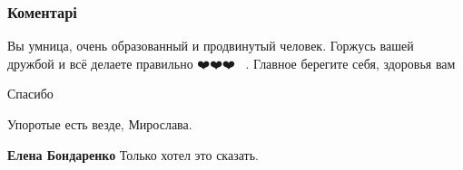  
 
 
 
 
\subsubsection{Коментарі}
\label{sec:27_07_2021.fb.berdnik_miroslava.3.neadekvat_mova.cmt}

\begin{itemize}
 
Вы умница, очень образованный и продвинутый человек. Горжусь вашей дружбой и
всё делаете правильно ❤️❤️❤️💋💋💋. Главное берегите себя, здоровья вам

\begin{itemize}
 
Спасибо
\end{itemize}

 

Упоротые есть везде, Мирослава.

\begin{itemize}
 
\textbf{Елена Бондаренко} Только хотел это сказать.

 

\end{itemize}
\end{itemize}
